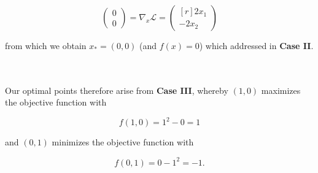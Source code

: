 \begin{solution}
    $$
    \begin{pmatrix*}
        0 \\
        0
    \end{pmatrix*} = \nabla_x \mathcal{L} = \begin{pmatrix*}[r]
        2 x_1 \\
       -2 x_2
    \end{pmatrix*}
    $$

    from which we obtain $x_* = (0, 0)$ (and $f(x) = 0$) which addressed in \textbf{Case II}.

    \ \\\\
    Our optimal points therefore arise from \textbf{Case III}, whereby $(1, 0)$ maximizes the objective function with 

    $$
    f(1, 0) = 1^2 - 0 = 1
    $$

    and $(0, 1)$ minimizes the objective function with 
    
    $$
    f(0, 1) = 0 - 1^2 = -1.
    $$
    \ \\
\end{solution}